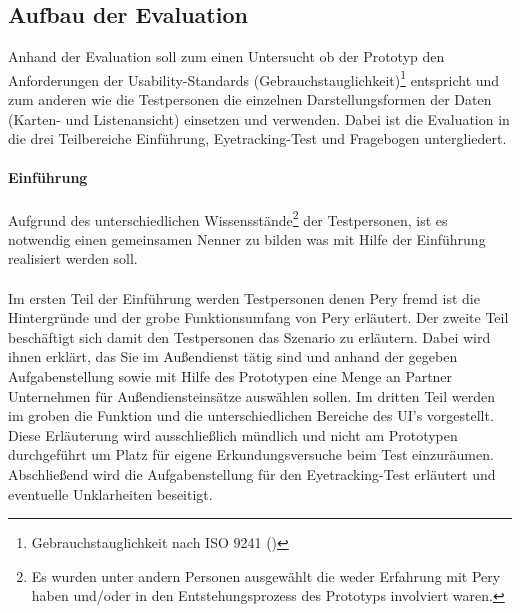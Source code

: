 \documentclass[Bachelorarbeit.tex]{subfiles}
\begin{document}
\subsection{Aufbau der Evaluation}
Anhand der Evaluation soll zum einen Untersucht ob der Prototyp den Anforderungen der Usability-Standards (Gebrauchstauglichkeit)\footnote{Gebrauchstauglichkeit nach ISO 9241 (\cite[siehe:][Abs.: 3.1 Gebrauchstauglichkeit]{Iso9241_11})} entspricht und zum anderen wie die Testpersonen die einzelnen Darstellungsformen der Daten (Karten- und Listenansicht) einsetzen und verwenden.
Dabei ist die Evaluation in die drei Teilbereiche Einführung, Eyetracking-Test und Fragebogen untergliedert.

\paragraph{Einführung}
Aufgrund des unterschiedlichen Wissensstände\footnote{Es wurden unter andern Personen ausgewählt die weder Erfahrung mit Pery haben und/oder in den Entstehungsprozess des Prototyps involviert waren.} der Testpersonen, ist es notwendig einen gemeinsamen Nenner zu bilden was mit Hilfe der Einführung realisiert werden soll.\\
\\
Im ersten Teil der Einführung werden Testpersonen denen Pery fremd ist die Hintergründe und der grobe Funktionsumfang von Pery erläutert.
Der zweite Teil beschäftigt sich damit den Testpersonen das Szenario zu erläutern. 
Dabei wird ihnen erklärt, das Sie im Außendienst tätig sind und anhand der gegeben Aufgabenstellung sowie mit Hilfe des Prototypen eine Menge an Partner Unternehmen für  Außendiensteinsätze auswählen sollen.
Im dritten Teil werden im groben die Funktion und die unterschiedlichen Bereiche des \ac{UI}'s vorgestellt. 
Diese Erläuterung wird ausschließlich mündlich und nicht am Prototypen durchgeführt um Platz für eigene Erkundungsversuche beim Test einzuräumen.
Abschließend wird die Aufgabenstellung für den Eyetracking-Test erläutert und eventuelle Unklarheiten beseitigt.
\end{document}
